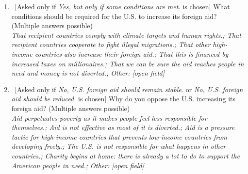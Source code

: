 \begin{enumerate}[resume]
\item ~[Asked only if \textit{Yes, but only if some conditions are met.} is chosen] What conditions should be required for the U.S. to increase its foreign aid? (Multiple answers possible)
\\ \textit{That recipient countries comply with climate targets and human rights.; That recipient countries cooperate to fight illegal migrations.; That other high-income countries also increase their foreign aid.; That this is financed by increased taxes on millionaires.; That we can be sure the aid reaches people in need and money is not diverted.; Other: [open field]}
\item ~[Asked only if \textit{No, U.S. foreign aid should remain stable.} or \textit{No, U.S. foreign aid should be reduced.} is chosen] Why do you oppose the U.S. increasing its foreign aid? (Multiple answers possible)
\\ \textit{Aid perpetuates poverty as it makes people feel less responsible for themselves.; Aid is not effective as most of it is diverted.; Aid is a pressure tactic for high-income countries that prevents low-income countries from developing freely.; The U.S. is not responsible for what happens in other countries.; Charity begins at home: there is already a lot to do to support the American people in need.; Other: [open field]}
\end{enumerate}

